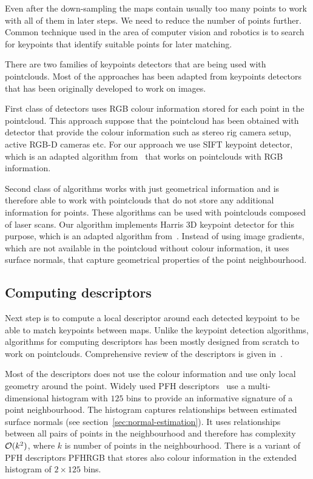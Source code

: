 Even after the down-sampling the maps contain usually too many points to work with all of them in later steps. We need to reduce the number of points further. Common technique used in the area of computer vision and robotics is to search for keypoints that identify suitable points for later matching.

There are two families of keypoints detectors that are being used with pointclouds. Most of the approaches has been adapted from keypoints detectors that has been originally developed to work on images.

First class of detectors uses \gls{RGB} colour information stored for each point in the pointcloud. This approach suppose that the pointcloud has been obtained with detector that provide the colour information such as stereo rig camera setup, active \gls{RGB-D} cameras etc. For our approach we use \gls{SIFT} keypoint detector, which is an adapted algorithm from~\citet{lowe2004distinctive} that works on pointclouds with \gls{RGB} information.

Second class of algorithms works with just geometrical information and is therefore able to work with pointclouds that do not store any additional information for points. These algorithms can be used with pointclouds composed of laser scans. Our algorithm implements Harris \gls{3D} keypoint detector for this purpose, which is an adapted algorithm from~\citet{harris1988combined}. Instead of using image gradients, which are not available in the pointcloud without colour information, it uses surface normals, that capture geometrical properties of the point neighbourhood.

\subsection{Computing descriptors}
\label{sec:compute-descriptors}

Next step is to compute a local descriptor around each detected keypoint to be able to match keypoints between maps. Unlike the keypoint detection algorithms, algorithms for computing descriptors has been mostly designed from scratch to work on pointclouds. Comprehensive review of the descriptors is given in~\citet{YasirThesis}.

Most of the descriptors does not use the colour information and use only local geometry around the point. Widely used \gls{PFH} descriptors~\citet{rusu2008pfh} use a multi-dimensional histogram with $125$ bins to provide an informative signature of a point neighbourhood. The histogram captures relationships between estimated surface normals (see section~\ref{sec:normal-estimation}). It uses relationships between all pairs of points in the neighbourhood and therefore has complexity $\operatorname{\mathcal{O}}(k^2)$, where $k$ is number of points in the neighbourhood. There is a variant of \gls{PFH} descriptors \gls{PFHRGB} that stores also colour information in the extended histogram of $2 \times 125$ bins.

